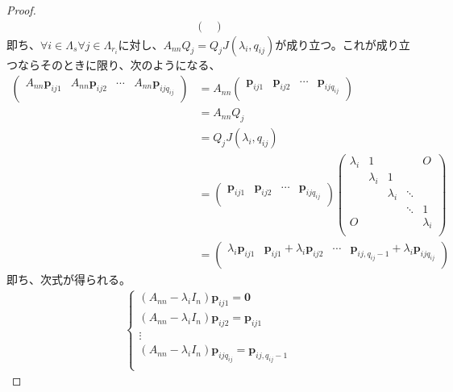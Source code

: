 \documentclass[dvipdfmx]{jsarticle}
\begin{document}
\begin{proof}
\begin{align*}
\begin{pmatrix}
\end{pmatrix}
\end{align*}
即ち、$\forall i \in \varLambda_{s}\forall j \in \varLambda_{r_{i}}$に対し、$A_{nn}Q_{j} = Q_{j}J\left( \lambda_{i},q_{ij} \right)$が成り立つ。これが成り立つならそのときに限り、次のようになる、
\begin{align*}
\begin{pmatrix}
A_{nn}\mathbf{p}_{ij1} & A_{nn}\mathbf{p}_{ij2} & \cdots & A_{nn}\mathbf{p}_{ijq_{ij}} \\
\end{pmatrix} &= A_{nn}\begin{pmatrix}
\mathbf{p}_{ij1} & \mathbf{p}_{ij2} & \cdots & \mathbf{p}_{ijq_{ij}} \\
\end{pmatrix}\\
&= A_{nn}Q_{j}\\
&= Q_{j}J\left( \lambda_{i},q_{ij} \right)\\
&= \begin{pmatrix}
\mathbf{p}_{ij1} & \mathbf{p}_{ij2} & \cdots & \mathbf{p}_{ijq_{ij}} \\
\end{pmatrix}\begin{pmatrix}
\lambda_{i} & 1 & \  & \  & O \\
\  & \lambda_{i} & 1 & \  & \  \\
\  & \  & \lambda_{i} & \ddots & \  \\
\  & \  & \  & \ddots & 1 \\
O & \  & \  & \  & \lambda_{i} \\
\end{pmatrix}\\
&= \begin{pmatrix}
\lambda_{i}\mathbf{p}_{ij1} & \mathbf{p}_{ij1} + \lambda_{i}\mathbf{p}_{ij2} & \cdots & \mathbf{p}_{ij,q_{ij} - 1} + \lambda_{i}\mathbf{p}_{ijq_{ij}} \\
\end{pmatrix}
\end{align*}
即ち、次式が得られる。
\begin{align*}
\left\{ \begin{matrix}
\left( A_{nn} - \lambda_{i}I_{n} \right)\mathbf{p}_{ij1} = \mathbf{0} \\
\left( A_{nn} - \lambda_{i}I_{n} \right)\mathbf{p}_{ij2} = \mathbf{p}_{ij1} \\
 \vdots \\
\left( A_{nn} - \lambda_{i}I_{n} \right)\mathbf{p}_{ijq_{ij}} = \mathbf{p}_{ij,q_{ij} - 1} \\
\end{matrix} \right.\ 
\end{align*}
\end{proof}\par
\end{document}
